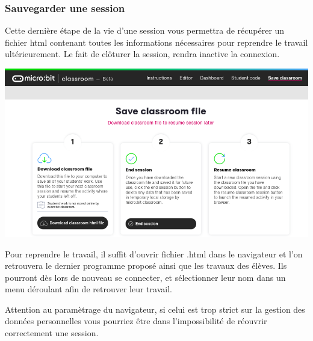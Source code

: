 \subsubsection{Sauvegarder une session}

    \begin{methode}
        Cette dernière étape de la vie d'une session vous permettra de récupérer un fichier html
        contenant toutes les informations nécessaires pour reprendre le travail ultérieurement.
        Le fait de clôturer la session, rendra inactive la connexion.
        
    \vspace{5mm}
    
    \centerline{\includegraphics[width=0.7\linewidth]{res/classroom_save.png}}
        
        Pour reprendre le travail, il suffit d'ouvrir fichier .html dans le navigateur et l'on 
        retrouvera le dernier programme proposé ainsi que les travaux des élèves. Ils pourront
         dès lors de nouveau se connecter, et sélectionner leur nom dans un menu déroulant afin de 
         retrouver leur travail.

    \end{methode}

    \begin{remarque}
        Attention au paramètrage du navigateur, si celui est trop strict sur la gestion des
         données personnelles vous pourriez être dans l'impossibilité de réouvrir correctement
         une session.
    \end{remarque}

